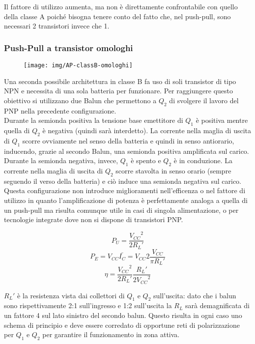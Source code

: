 Il fattore di utilizzo aumenta, ma non è direttamente
confrontabile con quello della classe A poiché bisogna tenere conto del fatto che, nel push-pull, sono necessari 2 transistori invece che 1.

\subsubsection{Push-Pull a transistor omologhi}

\begin{figure}[hbt]
\centering
\texttt{[image: img/AP-classB-omologhi]}
\caption{}
\label{fig:ap-classb-omologhi}
\end{figure}


Una seconda possibile architettura in classe B fa uso di soli transistor di tipo NPN e necessita di una sola batteria per funzionare. Per raggiungere questo obiettivo si utilizzano due Balun che permettono a $Q_2$ di svolgere il lavoro del PNP nella precedente configurazione.\\
Durante la semionda positiva la tensione base emettitore di $Q_1$ è positiva mentre quella di $Q_2$ è negativa (quindi sarà interdetto). La corrente nella maglia di uscita di $Q_1$ scorre ovviamente nel senso della batteria e quindi in senso antiorario, inducendo, grazie al secondo Balun, una semionda positiva amplificata sul carico.\\
Durante la semionda negativa, invece, $Q_1$ è spento e $Q_2$ è in conduzione. La corrente nella maglia di uscita di $Q_2$ scorre stavolta in senso orario (sempre seguendo il verso della batteria) e ciò induce una semionda negativa sul carico.\\
Questa configurazione non introduce miglioramenti nell'efficenza o nel fattore di utilizzo in quanto l'amplificazione di potenza è perfettamente analoga a quella di un push-pull ma risulta comunque utile in casi di singola alimentazione, o per tecnologie integrate dove non si dispone di transistori PNP.

\[ P_U = \frac{{V_{CC}}^2}{2{R_L}'} \]
\[ P_E = V_{CC} \bar{I_C} = V_{CC} 2 \frac{V_{CC}}{\pi {R_L}'} \]
\[ \eta = \frac{{V_{CC}}^2}{2{R_L}'} \frac{{R_L}'}{ 2{V_{CC}}^2 } \]

$R_L'$ è la resistenza vista dai collettori di $Q_1$ e $Q_2$ sull'uscita: dato che i balun sono rispettivamente 2:1 sull'ingresso e 1:2 sull'uscita la $R_L$ sarà demagnificata di un fattore 4 sul lato sinistro del secondo balun. Questo risulta in ogni caso uno schema di principio e deve essere corredato di opportune reti di polarizzazione per $Q_1$ e $Q_2$ per garantire il funzionamento in zona attiva.

